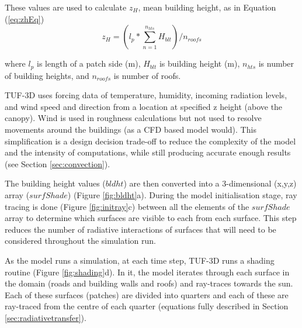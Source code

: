 \documentclass[preprint,12pt,authoryear]{elsarticle}
\begin{document}
These values are used to calculate $z_{H}$, mean building height, as in Equation (\ref{eq:zhEq})
\begin{equation}\label{eq:zhEq}
z_{H} = (l_{p}* \sum_{n=1}^{n _{hts}} {H _{blt}} ) / n _{roofs} 
\end{equation}

where $l_{p}$ is length of a patch side (m), $H _{blt}$ is building height (m), $n _{hts}$ is number of building heights, and $n _{roofs}$ is number of roofs.

TUF-3D uses forcing data of temperature, humidity, incoming radiation levels, and wind speed and direction from a location at specified z height (above the canopy). Wind is used in roughness calculations but not used to resolve movements around the buildings (as a CFD based model would). This simplification is a design decision trade-off to reduce the complexity of the model and the intensity of computations, while still producing accurate enough results (see Section \ref{sec:convection}).

The building height values ($bldht$) are then converted into a 3-dimensional (x,y,z) array ($surfShade$) (Figure \ref{fig:bldht}a). During the model initialisation stage, ray tracing is done (Figure \ref{fig:initray}c) between all the elements of the $surfShade$ array to determine which surfaces are visible to each from each surface. This step reduces the number of radiative interactions of surfaces that will need to be considered throughout the simulation run.  



As the model runs a simulation, at each time step, TUF-3D runs a shading routine (Figure \ref{fig:shading}d). In it, the model iterates through each surface in the domain (roads and building walls and roofs) and ray-traces towards the sun. Each of these surfaces (patches) are divided into quarters and each of these are ray-traced from the centre of each quarter (equations fully described in Section \ref{sec:radiativetransfer}). 

\end{document}
